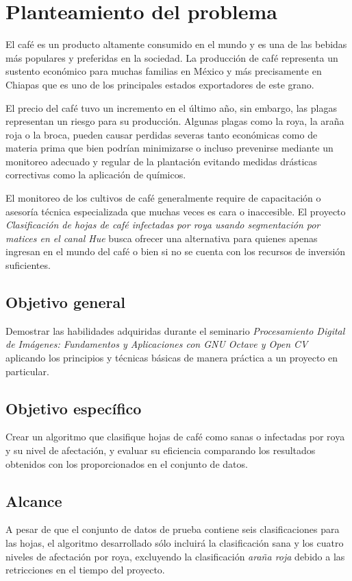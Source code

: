 \chapter{Planteamiento del problema}
El café es un producto altamente consumido en el mundo y es una de las bebidas más populares y preferidas en la sociedad. La producción de café representa un sustento económico para muchas familias en México y más precisamente en Chiapas que es uno de los principales estados exportadores de este grano.

El precio del café tuvo un incremento en el último año, sin embargo, las plagas representan un riesgo para su producción. Algunas plagas como la roya, la araña roja o la broca, pueden causar perdidas severas tanto económicas como de materia prima que bien podrían minimizarse o incluso prevenirse mediante un monitoreo adecuado y regular de la plantación evitando medidas drásticas correctivas como la aplicación de químicos.

El monitoreo de los cultivos de café generalmente require de capacitación o asesoría técnica especializada que muchas veces es cara o inaccesible. El proyecto \textit{Clasificación de hojas de café infectadas por roya usando segmentación por matices en el canal Hue} busca ofrecer una alternativa para quienes apenas ingresan en el mundo del café o bien si no se cuenta con los recursos de inversión suficientes.

\section{Objetivo general}
Demostrar las habilidades adquiridas durante el seminario \textit{Procesamiento Digital de Imágenes: Fundamentos y Aplicaciones con GNU Octave y Open CV} aplicando los principios y técnicas básicas de manera práctica a un proyecto en particular.

\section{Objetivo específico}
Crear un algoritmo que clasifique hojas de café como sanas o infectadas por roya y su nivel de afectación, y evaluar su eficiencia comparando los resultados obtenidos con los proporcionados en el conjunto de datos.

\section{Alcance}
A pesar de que el conjunto de datos de prueba contiene seis clasificaciones para las hojas, el algoritmo desarrollado sólo incluirá la clasificación sana y los cuatro niveles de afectación por roya, excluyendo la clasificación \textit{araña roja} debido a las retricciones en el tiempo del proyecto.


